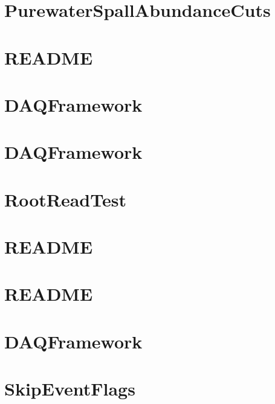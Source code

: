 \let\mypdfximage\pdfximage\def\pdfximage{\immediate\mypdfximage}\documentclass[twoside]{book}
\newcommand{\+}{\discretionary{\mbox{\scriptsize$\hookleftarrow$}}{}{}}
\begin{document}
\chapter{Purewater\+Spall\+Abundance\+Cuts}
\label{md_UserTools_PurewaterSpallAbundanceCuts_README}

\chapter{README}
\label{md_UserTools_ReadMCInfo_README}

\chapter{DAQFramework}
\label{md_UserTools_ReadMCParticles_README}

\chapter{DAQFramework}
\label{md_UserTools_README}

\chapter{Root\+Read\+Test}
\label{md_UserTools_RootReadTest_README}

\chapter{README}
\label{md_UserTools_RunwiseEnergyCut_README}

\chapter{README}
\label{md_UserTools_SimplifyTree_README}

\chapter{DAQFramework}
\label{md_UserTools_SK2p2MeV_README}

\chapter{Skip\+Event\+Flags}
\label{md_UserTools_SkipEventFlags_README}

\end{document}
